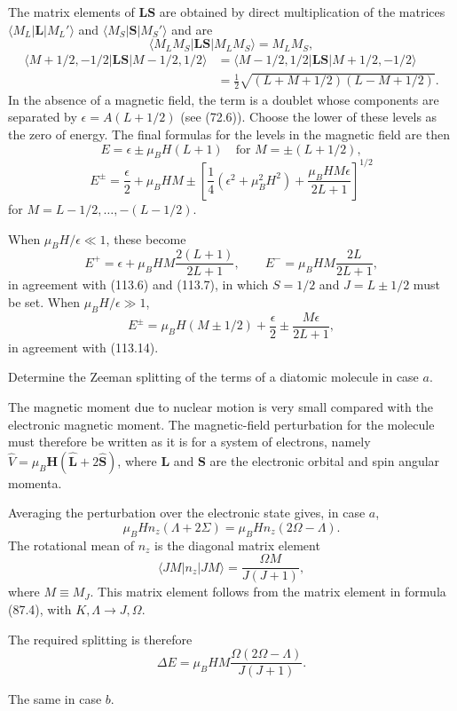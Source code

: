 The matrix elements of $\mathbf L\mathbf S$ are obtained by direct multiplication of the matrices $\langle M_L|\mathbf L|M_L'\rangle$ and $\langle M_S|\mathbf S|M_S'\rangle$ and are
\[
 \langle M_LM_S|\mathbf L\mathbf S|M_LM_S\rangle=M_LM_S,
\]
\[
 \begin{split}
 \langle M+1/2,-1/2|\mathbf L\mathbf S|M-1/2,1/2\rangle
 &=\langle M-1/2,1/2|\mathbf L\mathbf S|M+1/2,-1/2\rangle\\
 &=\frac12\sqrt{(L+M+1/2)(L-M+1/2)}.
 \end{split}
\]
In the absence of a magnetic field, the term is a doublet whose components are separated by $\epsilon=A(L+1/2)$ (see (72.6)). Choose the lower of these levels as the zero of energy. The final formulas for the levels in the magnetic field are then
\[
 E=\epsilon\pm\mu_BH(L+1)\quad\text{for }M=\pm(L+1/2),
\]
\[
 E^{\pm}=\frac\epsilon2+\mu_BHM\pm\left[\frac14(\epsilon^2+\mu_B^2H^2)+\frac{\mu_BHM\epsilon}{2L+1}\right]^{1/2}
\]
for $M=L-1/2,\ldots,-(L-1/2)$.

When $\mu_BH/\epsilon\ll1$, these become
\[
 E^+=\epsilon+\mu_BHM\frac{2(L+1)}{2L+1},\qquad E^-=\mu_BHM\frac{2L}{2L+1},
\]
in agreement with (113.6) and (113.7), in which $S=1/2$ and $J=L\pm1/2$ must be set. When $\mu_BH/\epsilon\gg1$,
\[
 E^\pm=\mu_BH(M\pm1/2)+\frac\epsilon2\pm\frac{M\epsilon}{2L+1},
\]
in agreement with (113.14).

 Determine the Zeeman splitting of the terms of a diatomic molecule in case $a$.

\SolutionHeading The magnetic moment due to nuclear motion is very small compared with the electronic magnetic moment. The magnetic-field perturbation for the molecule must therefore be written as it is for a system of electrons, namely $\hat V=\mu_B\mathbf H(\hat{\mathbf L}+2\hat{\mathbf S})$, where $\mathbf L$ and $\mathbf S$ are the electronic orbital and spin angular momenta.

Averaging the perturbation over the electronic state gives, in case $a$,
\[
 \mu_BHn_z(\Lambda+2\Sigma)=\mu_BHn_z(2\Omega-\Lambda).
\]
The rotational mean of $n_z$ is the diagonal matrix element
\[
 \langle JM|n_z|JM\rangle=\frac{\Omega M}{J(J+1)},
\]
where $M\equiv M_J$. This matrix element follows from the matrix element in formula (87.4), with $K,\Lambda\to J,\Omega$.

The required splitting is therefore
\[
 \Delta E=\mu_BHM\frac{\Omega(2\Omega-\Lambda)}{J(J+1)}.
\]

 The same in case $b$.

